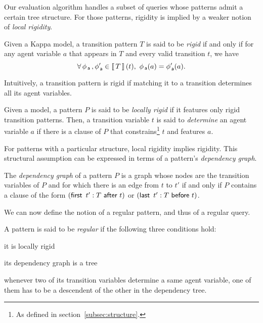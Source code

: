 \documentclass[runningheads]{llncs}
\begin{document}
Our evaluation algorithm handles a subset of queries whose patterns
admit a certain tree structure. For those patterns, rigidity is
implied by a weaker notion of \emph{local rigidity}.
\begin{definition}
  Given a Kappa model, a transition pattern $T$ is said to be
  \emph{rigid} if and only if for any agent variable $a$ that appears
  in $T$ and every valid transition $t$, we have
  \[ \forall\, \phi_{\,\textsf{a}}\,, \phi_{\,\textsf{a}}' \in \left\llbracket \, T \, \right\rrbracket(t), \ \phi_{\,\textsf{a}}(a)
    = \phi'_{\,\textsf{a}}(a). \]
\end{definition}
Intuitively, a transition pattern is rigid if matching it to a
transition determines all its agent variables.
\begin{definition}
  Given a model, a pattern $P$ is said to be \emph{locally rigid} if
  it features only rigid transition patterns. Then, a transition
  variable $t$ is said to \emph{determine} an agent variable $a$ if
  there is a clause of $P$ that constrains\footnote{As defined in
    section~\ref{subsec:structure}.} $t$ and features $a$.
\end{definition}
For patterns with a particular structure, local rigidity implies
rigidity. This structural assumption can be expressed in terms of a
pattern's \emph{dependency graph}.
\begin{definition}
  The \emph{dependency graph} of a pattern $P$ is a graph whose nodes
  are the transition variables of $P$ and for which there is an edge
  from $t$ to $t'$ if and only if $P$ contains a clause of the form
  $(\textsf{first} \,\ t':T \ \textsf{after} \ t)$ or $(\textsf{last} \,\ t':T \ \textsf{before} \ t)$.
\end{definition}
We can now define the notion of a regular pattern, and thus of a
regular query.
\begin{definition}\label{def:regularity}
  A pattern is said to be \emph{regular} if the following three
  conditions hold:
  \begin{inparaenum}[(i)]
  \item\label{reg:locally-rigid} it is locally rigid
  \item\label{reg:tree} its dependency graph is a tree
  \item\label{reg:well-captured} whenever two of its transition
    variables determine a same agent variable, one of them has to be a
    descendent of the other in the dependency tree.
  \end{inparaenum}
\end{definition}
\end{document}
